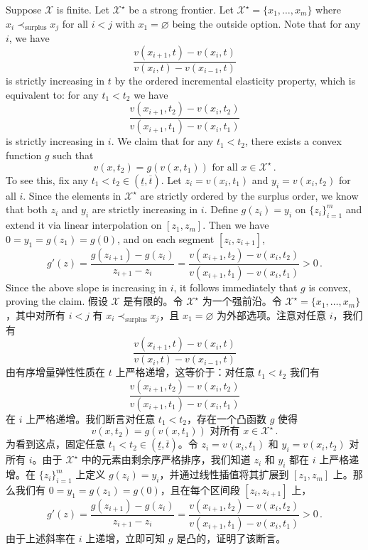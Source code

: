 \documentclass[12pt,letterpaper]{article}
\newenvironment{original}{\color{black}\noindent}{}
\newenvironment{translation}{\color{blue}\noindent}{}
\theoremstyle{plain}
\theoremstyle{definition}
\theoremstyle{remark}
\let\emptyset\varnothing
\renewcommand{\1}{\mathds{1}}
\newcommand{\X}{\mathcal{X}}
\theoremstyle{definition}
\begin{document}
\begin{original}
Suppose $\X$ is finite. Let $\X^\star$ be a strong frontier. Let $\X^\star = \{x_1, \dots, x_m\}$ where $x_i \prec_{\text{surplus}} x_j$ for all $i < j$ with $x_1 = \emptyset$ being the outside option. Note that for any $i$, we have
\[\frac{v(x_{i+1}, t) - v(x_i, t)}{v(x_{i}, t) - v(x_{i-1}, t)}\]
is strictly increasing in $t$ by the ordered incremental elasticity property, which is equivalent to: for any $t_1 < t_2$ we have
\[\frac{v(x_{i+1}, t_2) - v(x_i, t_2)}{v(x_{i+1}, t_1) - v(x_{i}, t_1)}\]
is strictly increasing in $i$. We claim that for any $t_1 < t_2$, there exists a convex function $g$ such that
\[v(x, t_2) = g(v(x, t_1)) \text{ for all $x \in \X^\star$}\,.\]
To see this, fix any $t_1 < t_2 \in (\underline{t}, \overline{t})$. Let $z_i = v(x_i, t_1)$ and $y_i = v(x_i, t_2)$ for all $i$. Since the elements in $\X^\star$ are strictly ordered by the surplus order, we know that both $z_i$ and $y_i$ are strictly increasing in $i$. Define $g(z_i) = y_i$ on $\{z_i\}_{i=1}^m$ and extend it via linear interpolation on $[z_1, z_m]$. Then we have $0 = y_1 = g(z_1) = g(0)$, and on each segment $[z_i, z_{i+1}]$,
\[g'(z) = \frac{g(z_{i+1}) - g(z_{i})}{z_{i+1} - z_{i}} = \frac{v(x_{i+1}, t_2) - v(x_{i}, t_2)}{v(x_{i+1},t_1) - v(x_i, t_1)} > 0 \,.\]
Since the above slope is increasing in $i$, it follows immediately that $g$ is convex, proving the claim.
\end{original}
\begin{translation}
假设 $\X$ 是有限的。令 $\X^\star$ 为一个强前沿。令 $\X^\star = \{x_1, \dots, x_m\}$，其中对所有 $i < j$ 有 $x_i \prec_{\text{surplus}} x_j$，且 $x_1 = \emptyset$ 为外部选项。注意对任意 $i$，我们有
\[\frac{v(x_{i+1}, t) - v(x_i, t)}{v(x_{i}, t) - v(x_{i-1}, t)}\]
由有序增量弹性性质在 $t$ 上严格递增，这等价于：对任意 $t_1 < t_2$ 我们有
\[\frac{v(x_{i+1}, t_2) - v(x_i, t_2)}{v(x_{i+1}, t_1) - v(x_{i}, t_1)}\]
在 $i$ 上严格递增。我们断言对任意 $t_1 < t_2$，存在一个凸函数 $g$ 使得
\[v(x, t_2) = g(v(x, t_1)) \text{ 对所有 $x \in \X^\star$}\,.\]
为看到这点，固定任意 $t_1 < t_2 \in (\underline{t}, \overline{t})$。令 $z_i = v(x_i, t_1)$ 和 $y_i = v(x_i, t_2)$ 对所有 $i$。由于 $\X^\star$ 中的元素由剩余序严格排序，我们知道 $z_i$ 和 $y_i$ 都在 $i$ 上严格递增。在 $\{z_i\}_{i=1}^m$ 上定义 $g(z_i) = y_i$，并通过线性插值将其扩展到 $[z_1, z_m]$ 上。那么我们有 $0 = y_1 = g(z_1) = g(0)$，且在每个区间段 $[z_i, z_{i+1}]$ 上，
\[g'(z) = \frac{g(z_{i+1}) - g(z_{i})}{z_{i+1} - z_{i}} = \frac{v(x_{i+1}, t_2) - v(x_{i}, t_2)}{v(x_{i+1},t_1) - v(x_i, t_1)} > 0 \,.\]
由于上述斜率在 $i$ 上递增，立即可知 $g$ 是凸的，证明了该断言。
\end{translation}
\end{document}
